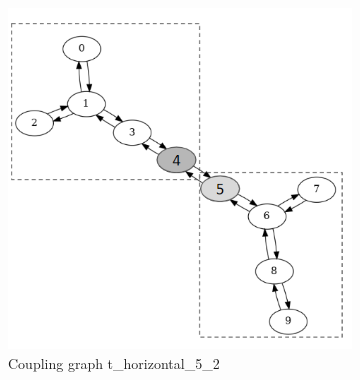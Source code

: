 \begin{figure}[!htb]
\begin{subfigure}{0.4\linewidth}
        \includegraphics[width=\linewidth]{image/coupling_graph_t_horizontal.png}
        \caption{Coupling graph t\_horizontal\_5\_2}
        \label{fig:coupling-graph-t-horizontal}
    \end{subfigure}
    \hfill
    \begin{subfigure}{0.3\linewidth}

\end{subfigure}
\end{figure}
